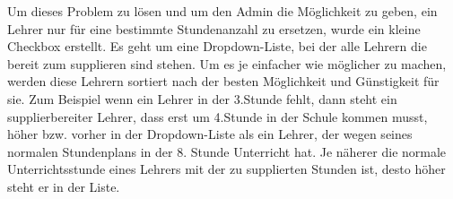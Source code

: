 Um dieses Problem zu lösen und um den Admin die Möglichkeit zu geben, ein Lehrer nur für eine bestimmte Stundenanzahl zu ersetzen, wurde ein kleine Checkbox erstellt. Es geht um eine Dropdown-Liste, bei der alle Lehrern die bereit zum supplieren sind stehen. Um es je einfacher wie möglicher zu machen, werden diese Lehrern sortiert nach der besten Möglichkeit und Günstigkeit für sie. Zum Beispiel wenn ein Lehrer in der 3.Stunde fehlt, dann steht ein supplierbereiter Lehrer, dass erst um 4.Stunde in der Schule kommen musst, höher bzw. vorher in der Dropdown-Liste als ein Lehrer, der wegen seines normalen Stundenplans in der 8. Stunde Unterricht hat. Je näherer die normale Unterrichtsstunde eines Lehrers mit der zu supplierten Stunden ist, desto höher steht er in der Liste.
